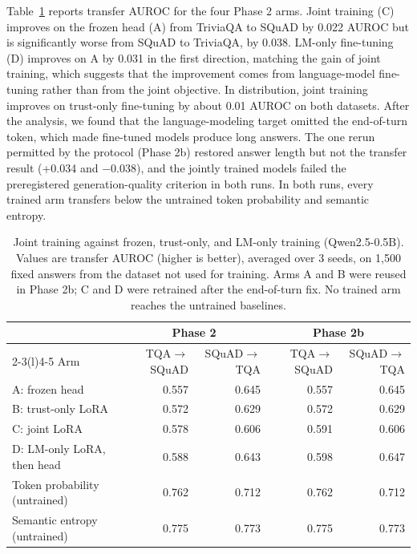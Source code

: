 \documentclass[10pt]{article}
\begin{document}
Table~\ref{tab:joint} reports transfer AUROC for the four Phase 2 arms. Joint training (C) improves on the frozen head (A) from TriviaQA to SQuAD by 0.022 AUROC but is significantly worse from SQuAD to TriviaQA, by 0.038. LM-only fine-tuning (D) improves on A by 0.031 in the first direction, matching the gain of joint training, which suggests that the improvement comes from language-model fine-tuning rather than from the joint objective. In distribution, joint training improves on trust-only fine-tuning by about 0.01 AUROC on both datasets. After the analysis, we found that the language-modeling target omitted the end-of-turn token, which made fine-tuned models produce long answers. The one rerun permitted by the protocol (Phase 2b) restored answer length but not the transfer result (+0.034 and $-$0.038), and the jointly trained models failed the preregistered generation-quality criterion in both runs. In both runs, every trained arm transfers below the untrained token probability and semantic entropy.

\begin{table}[t]
\centering
\small
\begin{tabular}{@{}lrrrr@{}}
\toprule
 & \multicolumn{2}{c}{Phase 2} & \multicolumn{2}{c}{Phase 2b} \\
\cmidrule(lr){2-3}\cmidrule(l){4-5}
Arm & TQA$\to$SQuAD & SQuAD$\to$TQA & TQA$\to$SQuAD & SQuAD$\to$TQA \\
\midrule
A: frozen head & 0.557 & 0.645 & 0.557 & 0.645 \\
B: trust-only LoRA & 0.572 & 0.629 & 0.572 & 0.629 \\
C: joint LoRA & 0.578 & 0.606 & 0.591 & 0.606 \\
D: LM-only LoRA, then head & 0.588 & 0.643 & 0.598 & 0.647 \\
\midrule
Token probability (untrained) & 0.762 & 0.712 & 0.762 & 0.712 \\
Semantic entropy (untrained) & 0.775 & 0.773 & 0.775 & 0.773 \\
\bottomrule
\end{tabular}
\caption{Joint training against frozen, trust-only, and LM-only training (Qwen2.5-0.5B). Values are transfer AUROC (higher is better), averaged over 3 seeds, on 1,500 fixed answers from the dataset not used for training. Arms A and B were reused in Phase 2b; C and D were retrained after the end-of-turn fix. No trained arm reaches the untrained baselines.}
\label{tab:joint}
\end{table}
\end{document}
